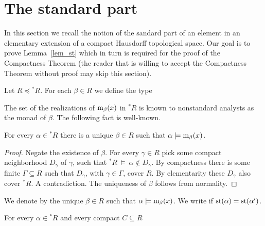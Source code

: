 \documentclass[11pt,oneside]{amsart}
\renewcommand*{\emph}[1]{%
   \smash{\tikz[baseline]\node[rectangle, fill=teal!25, rounded corners, inner xsep=0.5ex, inner ysep=0.2ex, anchor=base, minimum height = 2.7ex]{#1};}}
\begin{document}
\section{The standard part}

In this section we recall the notion of the sandard part of an element in an elementary extension of a compact Hausdorff topological space.
Our goal is to prove Lemma~\ref{lem_st} which in turn is required for the proof of the Compactness Theorem (the reader that is willing to accept the Compactness Theorem without proof may skip this section).


Let $R\preceq{}^*\!R$.
For each $\beta\in R$ we define the type


The set of the realizations of ${\rm m}_\beta(x)$ in ${}^*\!R$ is known to nonstandard analysts as the monad of $\beta$. 
The following fact is well-known.

\begin{fact}\label{fact_uniqueness_st}
  For every $\alpha\in{}^*\!R$ there is a unique $\beta\in R$ such that $\alpha\models{\rm m}_\beta(x)$.
\end{fact}

\begin{proof}
  Negate the existence of $\beta$.
  For every $\gamma\in R$ pick some compact neighborhood $D_\gamma$ of $\gamma$, such that ${}^*\!R\ \models\ \alpha\notin D_\gamma$.
  By compactness there is some finite $\Gamma\subseteq R$ such that $D_\gamma$, with $\gamma\in\Gamma$, cover $R$.
  By elementarity these $D_{\gamma}$ also cover ${}^*\!R$.
  A contradiction.
  The uniqueness of $\beta$ follows from normality.
\end{proof}

We denote by \emph{${\rm st}(\alpha)$\/} the unique $\beta\in R$ such that $\alpha\models{\rm m}_\beta(x)$.
We write \emph{$\alpha\approx\alpha'$\/} if ${\rm st}(\alpha)={\rm st}(\alpha')$.

\begin{fact}\label{fact_st1}
  For every $\alpha\in{}^*\! R$ and every compact $C\subseteq R$

\end{fact}
\end{document}

